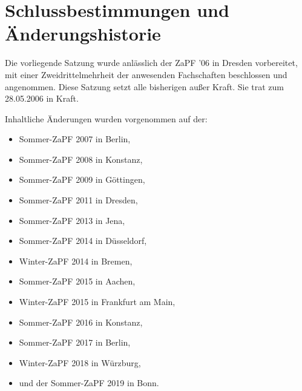 \documentclass[12pt,oneside]{scrartcl}
\begin{document}
\section{Schlussbestimmungen und Änderungshistorie%
  \label{schlussbestimmungen-und-anderungshistorie}%
}

Die vorliegende Satzung wurde anlässlich der ZaPF '06 in Dresden vorbereitet,
mit einer Zweidrittelmehrheit der anwesenden Fachschaften beschlossen und
angenommen. Diese Satzung setzt alle bisherigen außer Kraft. Sie trat zum
28.05.2006 in Kraft.

Inhaltliche Änderungen wurden vorgenommen auf der:

\begin{itemize}
\item Sommer-ZaPF 2007 in Berlin,

\item Sommer-ZaPF 2008 in Konstanz,

\item Sommer-ZaPF 2009 in Göttingen,

\item Sommer-ZaPF 2011 in Dresden,

\item Sommer-ZaPF 2013 in Jena,

\item Sommer-ZaPF 2014 in Düsseldorf,

\item Winter-ZaPF 2014 in Bremen,

\item Sommer-ZaPF 2015 in Aachen,

\item Winter-ZaPF 2015 in Frankfurt am Main,

\item Sommer-ZaPF 2016 in Konstanz,

\item Sommer-ZaPF 2017 in Berlin,

\item Winter-ZaPF 2018 in Würzburg,

\item und der Sommer-ZaPF 2019 in Bonn.
\end{itemize}
\end{document}
